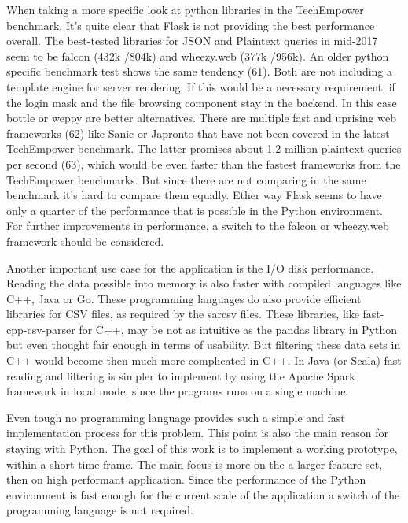\documentclass[american,a4paper,oneside,,tablecaptionabove]{scrbook}
\begin{document}
When taking a more specific look at python libraries in the TechEmpower
benchmark. It's quite clear that Flask is not providing the best
performance overall. The best-tested libraries for JSON and Plaintext
queries in mid-2017 seem to be falcon (432k /804k) and wheezy.web (377k
/956k). An older python specific benchmark test shows the same tendency
(61). Both are not including a template engine for server rendering. If
this would be a necessary requirement, if the login mask and the file
browsing component stay in the backend. In this case bottle or weppy are
better alternatives. There are multiple fast and uprising web frameworks
(62) like Sanic or Japronto that have not been covered in the latest
TechEmpower benchmark. The latter promises about 1.2 million plaintext
queries per second (63), which would be even faster than the fastest
frameworks from the TechEmpower benchmarks. But since there are not
comparing in the same benchmark it's hard to compare them equally. Ether
way Flask seems to have only a quarter of the performance that is
possible in the Python environment. For further improvements in
performance, a switch to the falcon or wheezy.web framework should be
considered.

Another important use case for the application is the I/O disk
performance. Reading the data possible into memory is also faster with
compiled languages like C++, Java or Go. These programming languages do
also provide efficient libraries for CSV files, as required by the
sarcsv files. These libraries, like fast-cpp-csv-parser for C++, may be
not as intuitive as the pandas library in Python but even thought fair
enough in terms of usability. But filtering these data sets in C++ would
become then much more complicated in C++. In Java (or Scala) fast
reading and filtering is simpler to implement by using the Apache Spark
framework in local mode, since the programs runs on a single machine.

Even tough no programming language provides such a simple and fast
implementation process for this problem. This point is also the main
reason for staying with Python. The goal of this work is to implement a
working prototype, within a short time frame. The main focus is more on
the a larger feature set, then on high performant application. Since the
performance of the Python environment is fast enough for the current
scale of the application a switch of the programming language is not
required.
\end{document}
